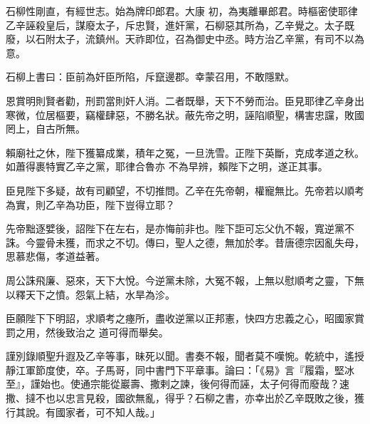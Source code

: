 \begin{pinyinscope}
 石柳性剛直，有經世志。始為牌印郎君。大康
 初，為夷離畢郎君。時樞密使耶律乙辛誣殺皇后，謀廢太子，斥忠賢，進奸黨，石柳惡其所為，乙辛覺之。太子既廢，以石附太子，流鎮州。天祚即位，召為御史中丞。時方治乙辛黨，有司不以為意。



 石柳上書曰：臣前為奸臣所陷，斥竄邊郡。幸蒙召用，不敢隱默。



 恩賞明則賢者勸，刑罰當則奸人消。二者既舉，天下不勞而治。臣見耶律乙辛身出寒微，位居樞要，竊權肆惡，不勝名狀。蔽先帝之明，誣陷順聖，構害忠讜，敗國罔上，自古所無。



 賴廟社之休，陛下獲纂成業，積年之冤，一旦洗雪。正陛下英斷，克成孝道之秋。如蕭得裹特實乙辛之黨，耶律合魯亦
 不為早辨，賴陛下之明，遂正其事。



 臣見陛下多疑，故有司顧望，不切推問。乙辛在先帝朝，權寵無比。先帝若以順考為實，則乙辛為功臣，陛下豈得立耶？



 先帝黜逐嬖後，詔陛下在左右，是亦悔前非也。陛下詎可忘父仇不報，寬逆黨不誅。今靈骨未獲，而求之不切。傳曰，聖人之德，無加於孝。昔唐德宗因亂失母，思慕悲傷，孝道益著。



 周公誅飛廉、惡來，天下大悅。今逆黨未除，大冤不報，上無以慰順考之靈，下無以釋天下之憤。怨氣上結，水旱為沴。



 臣願陛下下明詔，求順考之瘞所，盡收逆黨以正邦憲，快四方忠義之心，昭國家賞罰之用，然後致治之
 道可得而舉矣。



 謹別錄順聖升遐及乙辛等事，昧死以聞。書奏不報，聞者莫不嘆惋。乾統中，遙授靜江軍節度使，卒。子馬哥，同中書門下平章事。論曰：「《易》言『履霜，堅冰至』，謹始也。使通宗能從巖壽、撒剌之諫，後何得而誣，太子何得而廢哉？速撒、撻不也以忠言見殺，國欲無亂，得乎？石柳之書，亦幸出於乙辛既敗之後，獲行其說。有國家者，可不知人哉。」



\end{pinyinscope}